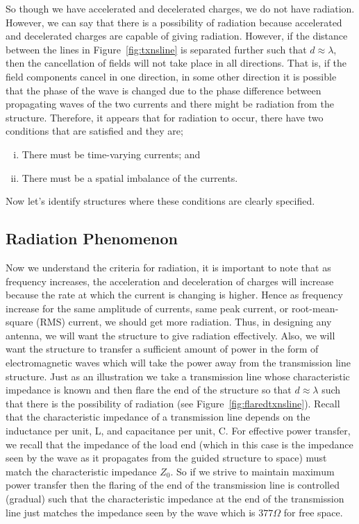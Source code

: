 So though we have accelerated and decelerated charges, we do not have radiation. However, we can say that there is a possibility of radiation because accelerated and decelerated charges are capable of giving radiation. However, if the distance between the lines in Figure~\ref{fig:txnsline} is separated further such that $d\approx\lambda$, then the cancellation of fields will not take place in all directions. That is, if the field components cancel in one direction, in some other direction it is possible that the phase of the wave is changed due to the phase difference between propagating waves of the two currents and there might be radiation from the structure.
Therefore, it appears that for radiation to occur, there have two conditions that are satisfied and they are; 
\begin{enumerate}[(i)]
\item There must be time-varying currents; and
\item There must be a spatial imbalance of the currents.
\end{enumerate}
Now let's identify structures where these conditions are clearly specified.

\subsection{Radiation Phenomenon}
Now we understand the criteria for radiation, it is important to note that as frequency increases, the acceleration and deceleration of charges will increase because the rate at which the current is changing is higher. Hence as frequency increase for the same amplitude of currents, same peak current, or root-mean-square (RMS) current, we should get more radiation. Thus, in designing any antenna, we will want the structure to give radiation effectively. Also, we will want the structure to transfer a sufficient amount of power in the form of electromagnetic waves which will take the power away from the transmission line structure. Just as an illustration we take a transmission line whose characteristic impedance is known and then flare the end of the structure so that $d\approx\lambda$ such that there is the possibility of radiation (see Figure~\ref{fig:flaredtxnsline}). Recall that the characteristic impedance of a transmission line depends on the inductance per unit, L, and capacitance per unit, C. For effective power transfer, we recall that the impedance of the load end (which in this case is the impedance seen by the wave as it propagates from the guided structure to space) must match the characteristic impedance $Z_0$. So if we strive to maintain maximum power transfer then the flaring of the end of the transmission line is controlled (gradual) such that the characteristic impedance at the end of the transmission line just matches the impedance seen by the wave which is $377\Omega$ for free space.

